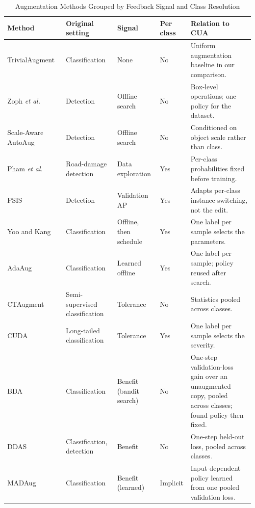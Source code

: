 \documentclass[conference]{IEEEtran}
\begin{document}
\begin{table}[t]
\caption{Augmentation Methods Grouped by Feedback Signal and Class Resolution}
\label{tab:policies}
\centering
\small
\setlength{\tabcolsep}{3.5pt}
\renewcommand{\arraystretch}{1.12}
\begin{tabularx}{\textwidth}{@{}p{}p{}p{}p{}Y@{}}
\toprule
\textbf{Method} & \textbf{Original setting} & \textbf{Signal} & \textbf{Per class} & \textbf{Relation to CUA} \\
\midrule
TrivialAugment~\cite{muller2021trivial} & Classification & None & No & Uniform augmentation baseline in our comparison. \\
Zoph \emph{et al.}~\cite{zoph2020det} & Detection & Offline search & No & Box-level operations; one policy for the dataset. \\
Scale-Aware AutoAug~\cite{chen2021scale} & Detection & Offline search & No & Conditioned on object scale rather than class. \\
Pham \emph{et al.}~\cite{rdd_detectron2} & Road-damage detection & Data exploration & Yes & Per-class probabilities fixed before training. \\
PSIS~\cite{wang2019psis} & Detection & Validation AP & Yes & Adapts per-class instance switching, not the edit. \\
Yoo and Kang~\cite{yoo2023} & Classification & Offline, then schedule & Yes & One label per sample selects the parameters. \\
AdaAug~\cite{cheung2022adaaug} & Classification & Learned offline & Yes & One label per sample; policy reused after search. \\
CTAugment~\cite{berthelot2020} & Semi-supervised classification & Tolerance & No & Statistics pooled across classes. \\
CUDA~\cite{ahn2023cuda} & Long-tailed classification & Tolerance & Yes & One label per sample selects the severity. \\
BDA~\cite{lu2023bda} & Classification & Benefit (bandit search) & No & One-step validation-loss gain over an unaugmented copy, pooled across classes; found policy then fixed. \\
DDAS~\cite{liu2021ddas} & Classification, detection & Benefit & No & One-step held-out loss, pooled across classes. \\
MADAug~\cite{hou2023madaug} & Classification & Benefit (learned) & Implicit & Input-dependent policy learned from one pooled validation loss. \\

\end{tabularx}
\end{table}
\end{document}
